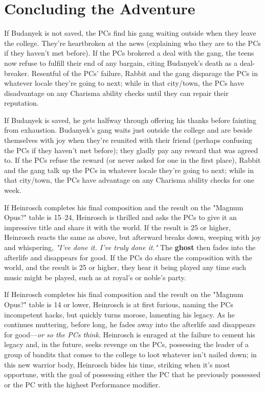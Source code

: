 \documentclass[10pt,a4paper,twoside,bg=print,twocolumn,openany,nodeprecatedcode]{dndbook}
\begin{document}
\section{Concluding the Adventure}
If Budanyek is not saved, the PCs find his gang waiting outside when they leave the college. They're heartbroken at the news (explaining who they are to the PCs if they haven't met before). If the PCs brokered a deal with the gang, the teens now refuse to fulfill their end of any bargain, citing Budanyek's death as a deal-breaker. Resentful of the PCs' failure, Rabbit and the gang disparage the PCs in whatever locale they're going to next; while in that city/town, the PCs have disadvantage on any Charisma ability checks until they can repair their reputation.

If Budanyek is saved, he gets halfway through offering his thanks before fainting from exhaustion. Budanyek's gang waits just outside the college and are beside themselves with joy when they're reunited with their friend (perhaps confusing the PCs if they haven't met before); they gladly pay any reward that was agreed to. If the PCs refuse the reward (or never asked for one in the first place), Rabbit and the gang talk up the PCs in whatever locale they're going to next; while in that city/town, the PCs have advantage on any Charisma ability checks for one week.

If Heinrosch completes his final composition and the result on the "Magnum Opus?" table is 15–24, Heinrosch is thrilled and asks the PCs to give it an impressive title and share it with the world. If the result is 25 or higher, Heinrosch reacts the same as above, but afterward breaks down, weeping with joy and whispering, \textit{"I've done it. I've truly done it."} The \textbf{ghost} then fades into the afterlife and disappears for good. If the PCs do share the composition with the world, and the result is 25 or higher, they hear it being played any time such music might be played, such as at royal's or noble's party.

If Heinrosch completes his final composition and the result on the "Magnum Opus?" table is 14 or lower, Heinrosch is at first furious, naming the PCs incompetent hacks, but quickly turns morose, lamenting his legacy. As he continues muttering, before long, he fades away into the afterlife and disappears for good—\textit{or so the PCs think}. Heinrosch is enraged at the failure to cement his legacy and, in the future, seeks revenge on the PCs, possessing the leader of a group of bandits that comes to the college to loot whatever isn't nailed down; in this new warrior body, Heinrosch bides his time, striking when it's most opportune, with the goal of possessing either the PC that he previously possessed or the PC with the highest Performance modifier.
\end{document}
